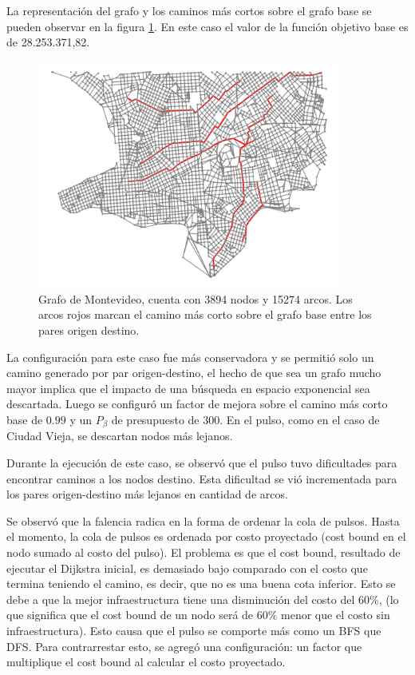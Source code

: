 \documentclass{article}
\begin{document}
  La representación del grafo y los caminos más cortos sobre el grafo base se pueden observar en la figura \ref{montevideo}. En este caso el valor de la función objetivo base es de 28.253.371,82.

  \begin{figure}[h!]
    \centering
    \includegraphics[width=10cm]{imgs/mdeo_large_base.png}
    \caption{Grafo de Montevideo, cuenta con 3894 nodos y 15274 arcos. Los arcos rojos marcan el camino más corto sobre el grafo base entre los pares origen destino.}
    \label{montevideo}
  \end{figure}

  La configuración para este caso fue más conservadora y se permitió solo un camino generado por par origen-destino, el hecho de que sea un grafo mucho mayor implica que el impacto de una búsqueda en espacio exponencial sea descartada. Luego se configuró un factor de mejora sobre el camino más corto base de $0.99$ y un $P_{\beta}$ de presupuesto de 300. En el pulso, como en el caso de Ciudad Vieja, se descartan nodos más lejanos.

  Durante la ejecución de este caso, se observó que el pulso tuvo dificultades para encontrar caminos a los nodos destino. Esta dificultad se vió incrementada para los pares origen-destino más lejanos en cantidad de arcos.

  Se observó que la falencia radica en la forma de ordenar la cola de pulsos. Hasta el momento, la cola de pulsos es ordenada por costo proyectado (cost bound en el nodo sumado al costo del pulso). El problema es que el cost bound, resultado de ejecutar el Dijkstra inicial, es demasiado bajo comparado con el costo que termina teniendo el camino, es decir, que no es una buena cota inferior. Esto se debe a que la mejor infraestructura tiene una disminución del costo del $60\%$, (lo que significa que el cost bound de un nodo será de $60\%$ menor que el costo sin infraestructura). Esto causa que el pulso se comporte más como un BFS que DFS. Para contrarrestar esto, se agregó una configuración: un factor que multiplique el cost bound al calcular el costo proyectado.
\end{document}
